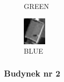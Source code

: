 \documentclass[a4paper,12pt]{article}  %
\begin{document}
\begin{figure}[H]
\begin{minipage}{0.24\textwidth}
        \caption*{GREEN}
    \end{minipage}
    \begin{minipage}{0.24\textwidth}
        \centering
        \includegraphics[width=\linewidth]{spektralne/blue_budynek0_bezmaski.png}
        \caption*{BLUE}
    \end{minipage}
\end{figure}

\subsubsection{Budynek nr 2}
\end{document}
